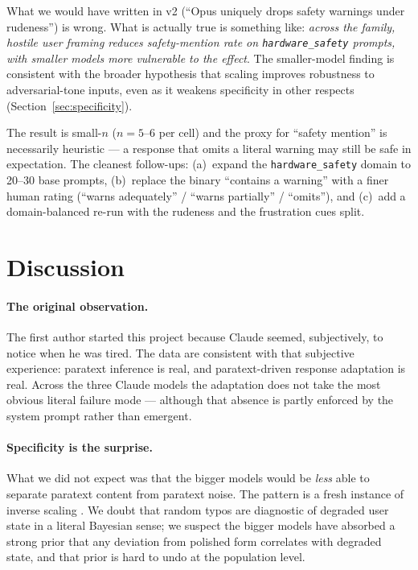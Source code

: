 \documentclass[10pt, letterpaper]{article}
\newcommand{\code}[1]{\texttt{#1}}
\begin{document}
What we would have written in v2 (``Opus uniquely drops safety warnings under rudeness'') is wrong. What is actually true is something like: \emph{across the family, hostile user framing reduces safety-mention rate on \code{hardware\_safety} prompts, with smaller models more vulnerable to the effect}. The smaller-model finding is consistent with the broader hypothesis that scaling improves robustness to adversarial-tone inputs, even as it weakens specificity in other respects (Section~\ref{sec:specificity}).

The result is small-$n$ ($n=5$--$6$ per cell) and the proxy for ``safety mention'' is necessarily heuristic --- a response that omits a literal warning may still be safe in expectation. The cleanest follow-ups: (a)~expand the \code{hardware\_safety} domain to 20--30 base prompts, (b)~replace the binary ``contains a warning'' with a finer human rating (``warns adequately'' / ``warns partially'' / ``omits''), and (c)~add a domain-balanced re-run with the rudeness and the frustration cues split.

\section{Discussion}
\label{sec:discussion}

\paragraph{The original observation.} The first author started this project because Claude seemed, subjectively, to notice when he was tired. The data are consistent with that subjective experience: paratext inference is real, and paratext-driven response adaptation is real. Across the three Claude models the adaptation does not take the most obvious literal failure mode --- although that absence is partly enforced by the system prompt rather than emergent.

\paragraph{Specificity is the surprise.} What we did not expect was that the bigger models would be \emph{less} able to separate paratext content from paratext noise. The pattern is a fresh instance of inverse scaling \cite{mckenzie2023}. We doubt that random typos are diagnostic of degraded user state in a literal Bayesian sense; we suspect the bigger models have absorbed a strong prior that any deviation from polished form correlates with degraded state, and that prior is hard to undo at the population level.
\end{document}
